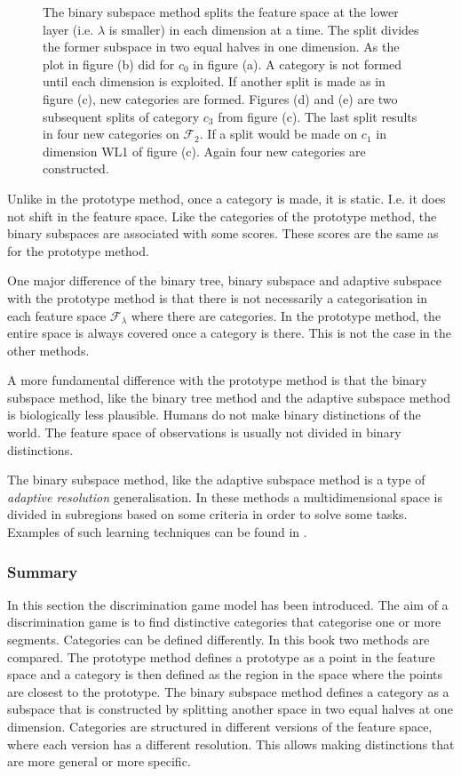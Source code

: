 \begin{figure}
\caption{The binary subspace method splits the feature space at the lower layer (i.e. $\lambda$ is smaller) in each dimension at a time. The split divides the former subspace in two equal halves in one dimension. As the plot in figure (b) did for $c_0$ in figure (a). A category is not formed until each dimension is exploited. If another split is made as in figure (c), new categories are formed. Figures (d) and (e) are two subsequent splits of category $c_3$ from figure (c). The last split results in four new categories on ${\mathcal F}_2$. If a split would be made on $c_1$ in dimension WL1 of figure (c). Again four new categories are constructed.}
\label{f:lg:subspace}
\end{figure}


Unlike in the prototype method, once a category is made, it is static. I.e. it does not shift in the feature space. Like the categories of the prototype method, the binary subspaces are associated with some scores. These scores are the same as for the prototype method. 

One major difference of the binary tree, binary subspace and adaptive subspace with the prototype method is that there is not necessarily a categorisation in each feature space ${\mathcal F}_\lambda$ where there are categories. In the prototype method, the entire space is always covered once a category is there. This is not the case in the other methods. 

A more fundamental difference with the prototype method is that the binary subspace method, like the binary tree method and the adaptive subspace method is biologically less plausible. Humans do not make binary distinctions of the world. The feature space of observations is usually not divided in binary distinctions.


The binary subspace method, like the adaptive subspace method \citep{dejong:2000} is a type of {\em adaptive resolution} generalisation. In these methods a multidimensional space is divided in subregions based on some criteria in order to solve some tasks. Examples of such learning techniques can be found in \citep{chapmankaebling:1991,moore:1995}.

\subsubsection{Summary}

In this section the discrimination game model has been introduced. The aim of a discrimination game is to find distinctive categories that categorise one or more segments. Categories can be defined differently. In this book two methods are compared. The prototype method defines a prototype as a point in the feature space and a category is then defined as the region in the space where the points are closest to the prototype. The binary subspace method defines a category as a subspace that is constructed by splitting another space in two equal halves at one dimension. Categories are structured in different versions of the feature space, where each version has a different resolution. This allows making distinctions that are more general or more specific. 

